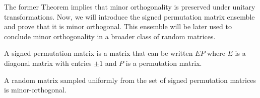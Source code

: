 The former Theorem implies that minor orthogonality is preserved under unitary transformations. Now, we will introduce the signed permutation matrix ensemble and prove that it is minor orthogonal. This ensemble will be later used to conclude minor orthogonality in a broader class of random matrices.

\begin{definition}
    A signed permutation matrix is a matrix that can be written $EP$ where $E$ is a diagonal matrix with entries $\pm 1$ and $P$ is a permutation matrix.
\end{definition}

\begin{lemma} \label{lemma:singed_per_is_minorth}
    A random matrix sampled uniformly from the set of signed permutation matrices is minor-orthogonal.
\end{lemma}

